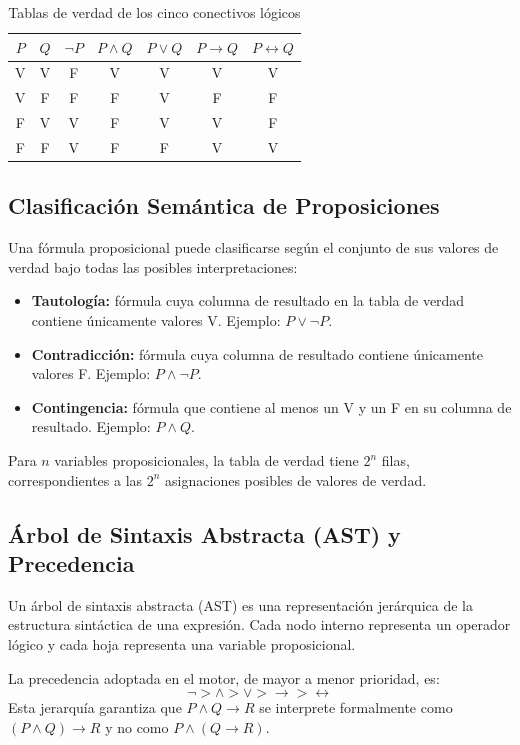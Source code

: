 \documentclass[11pt,a4paper]{article}
\begin{document}
\begin{table}[H]
\centering
\caption{Tablas de verdad de los cinco conectivos lógicos}
\label{tab:conectivos}
\small
\begin{tabular}{ccccccc}
\toprule
$P$ & $Q$ & $\neg P$ & $P \land Q$ & $P \lor Q$ & $P \to Q$ & $P \leftrightarrow Q$ \\
\midrule
V & V & F & V & V & V & V \\
V & F & F & F & V & F & F \\
F & V & V & F & V & V & F \\
F & F & V & F & F & V & V \\
\bottomrule
\end{tabular}
\end{table}

\subsection{Clasificación Semántica de Proposiciones}
Una fórmula proposicional puede clasificarse según el conjunto de sus valores de verdad bajo todas las posibles interpretaciones:
\begin{itemize}[leftmargin=*]
  \item \textbf{Tautología:} fórmula cuya columna de resultado en la tabla de verdad contiene únicamente valores V. Ejemplo: $P \lor \neg P$.
  \item \textbf{Contradicción:} fórmula cuya columna de resultado contiene únicamente valores F. Ejemplo: $P \land \neg P$.
  \item \textbf{Contingencia:} fórmula que contiene al menos un V y un F en su columna de resultado. Ejemplo: $P \land Q$.
\end{itemize}
Para $n$ variables proposicionales, la tabla de verdad tiene $2^n$ filas, correspondientes a las $2^n$ asignaciones posibles de valores de verdad.

\subsection{Árbol de Sintaxis Abstracta (AST) y Precedencia}
Un árbol de sintaxis abstracta (AST) es una representación jerárquica de la estructura sintáctica de una expresión. Cada nodo interno representa un operador lógico y cada hoja representa una variable proposicional.

La precedencia adoptada en el motor, de mayor a menor prioridad, es:
$$\neg > \land > \lor > \to > \leftrightarrow$$
Esta jerarquía garantiza que $P \land Q \to R$ se interprete formalmente como $(P \land Q) \to R$ y no como $P \land (Q \to R)$.
\end{document}
